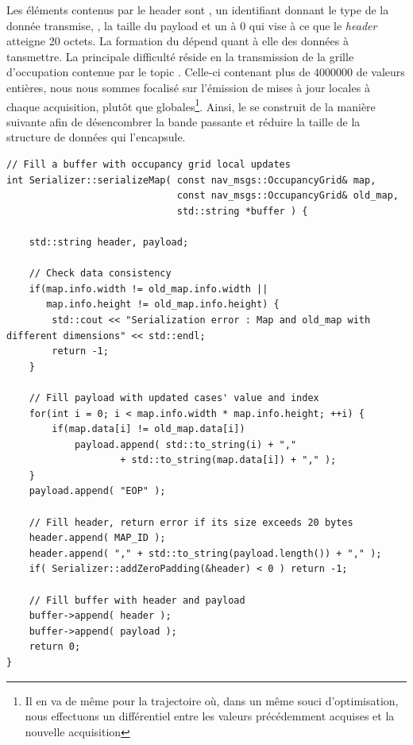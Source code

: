 Les éléments contenus par le header sont , un identifiant donnant le type de la donnée transmise, , la taille du payload et un  à $0$ qui vise à ce que le \emph{header} atteigne 20 octets. 
La formation du  dépend quant à elle des données à tansmettre. 
La principale difficulté réside en la transmission de la grille d'occupation contenue par le topic . 
Celle-ci contenant plus de $4 000 000$ de valeurs entières, nous nous sommes focalisé sur l'émission de mises à jour locales à chaque acquisition, plutôt que globales\footnote{Il en va de même pour la trajectoire où,
dans un même souci d'optimisation, nous effectuons un différentiel entre les valeurs précédemment acquises et la nouvelle acquisition}. 
Ainsi, le  se construit de la manière suivante afin de désencombrer la bande passante et réduire la taille de la structure de données qui l'encapsule. 

\newpage

\begin{lstlisting}[style = customcpp]
// Fill a buffer with occupancy grid local updates
int Serializer::serializeMap( const nav_msgs::OccupancyGrid& map, 
							  const nav_msgs::OccupancyGrid& old_map, 
							  std::string *buffer ) {
	
	std::string header, payload; 
	
	// Check data consistency  
	if(map.info.width != old_map.info.width || 
	   map.info.height != old_map.info.height) {
		std::cout << "Serialization error : Map and old_map with different dimensions" << std::endl; 
		return -1; 
	}	
	
	// Fill payload with updated cases' value and index
	for(int i = 0; i < map.info.width * map.info.height; ++i) {
		if(map.data[i] != old_map.data[i])	
		    payload.append( std::to_string(i) + ","
				    + std::to_string(map.data[i]) + "," );	
	}	
	payload.append( "EOP" );
	
	// Fill header, return error if its size exceeds 20 bytes
	header.append( MAP_ID );
	header.append( "," + std::to_string(payload.length()) + "," );
	if( Serializer::addZeroPadding(&header) < 0 ) return -1; 
	
	// Fill buffer with header and payload 
	buffer->append( header );
	buffer->append( payload );	
	return 0; 
}
\end{lstlisting}

